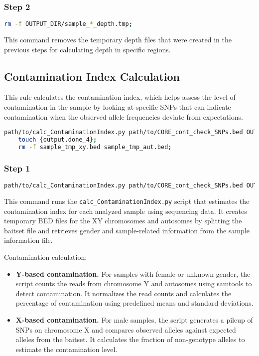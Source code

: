 \subsubsection*{Step 2}

\begin{lstlisting}[breaklines=true, language=bash]
    rm -f OUTPUT_DIR/sample_*_depth.tmp;
\end{lstlisting}

This command removes the temporary depth files that were created in the previous steps for calculating depth in specific regions.

\subsection{Contamination Index Calculation}

This rule calculates the contamination index, which helps assess the level of contamination in the sample by looking at specific SNPs that can indicate contamination when the observed allele frequencies deviate from expectations.

\begin{lstlisting}[breaklines=true, language=bash]
    path/to/calc_ContaminationIndex.py path/to/CORE_cont_check_SNPs.bed OUTPUT_DIR sample.bam SAMPLE_INFO;
    touch {output.done_4};
    rm -f sample_tmp_xy.bed sample_tmp_aut.bed;
\end{lstlisting}

\subsubsection*{Step 1}

\begin{lstlisting}[breaklines=true, language=bash]
    path/to/calc_ContaminationIndex.py path/to/CORE_cont_check_SNPs.bed OUTPUT_DIR sample.bam SAMPLE_INFO;
\end{lstlisting}

This command runs the \texttt{calc\_ContaminationIndex.py} script that estimates the contamination index for each analyzed sample using sequencing data. It creates temporary BED files for the XY chromosomes and autosomes by splitting the baitset file and retrieves gender and sample-related information from the sample information file.

Contamination calculation:
\begin{itemize}
    \item \textbf{Y-based contamination.} For samples with female or unknown gender, the script counts the reads from chromosome Y and autosomes using samtools to detect contamination. It normalizes the read counts and calculates the percentage of contamination using predefined means and standard deviations.
    \item \textbf{X-based contamination.} For male samples, the script generates a pileup of SNPs on chromosome X and compares observed alleles against expected alleles from the baitset. It calculates the fraction of non-genotype alleles to estimate the contamination level.
\end{itemize}

